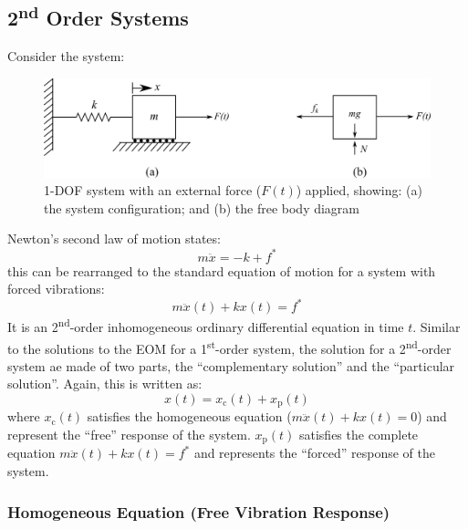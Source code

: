 \documentclass[12pt,letter]{article}
\numberwithin{ex}{section} %
\numberwithin{re}{section} %
\numberwithin{equation}{section}	%
\begin{document}
\subsection{2\textsuperscript{nd} Order Systems}


Consider the system:
			\begin{figure}[H]
				\centering
				\includegraphics[]{../figures/1-DOF-spring_mass_horizontal_forced_FBD.png}
				\caption{1-DOF system with an external force ($F(t)$) applied, showing: (a) the system configuration; and (b) the free body diagram}
				\label{fig:1-DOF-spring_mass_horizontal_forced_FBD}
			\end{figure}	

Newton's second law of motion states:
\begin{equation}
m \ddot{x} = -k + f^*
\end{equation}
this can be rearranged to the standard equation of motion for a system with forced vibrations:
\begin{equation}
m \ddot{x}(t) + kx(t) = f^*
\label{eq:EOM_2nd}
\end{equation}
It is an 2\textsuperscript{nd}-order inhomogeneous ordinary differential equation in time $t$.  Similar to the solutions to the EOM for a 1\textsuperscript{st}-order system, the solution for a 2\textsuperscript{nd}-order system ae made of two parts, the ``complementary solution'' and the ``particular solution''. Again, this is written as:
\begin{equation}
x(t) = x_\text{c}(t)+x_\text{p}(t)
\end{equation}
where $x_\text{c}(t)$ satisfies the homogeneous equation ($m \ddot{x}(t) + kx(t) = 0$) and represent the ``free'' response of the system. $x_\text{p}(t)$ satisfies the complete equation $m \ddot{x}(t) + kx(t) = f^*$ and represents the ``forced'' response of the system.


\subsubsection{Homogeneous Equation (Free Vibration Response)}
\end{document}
